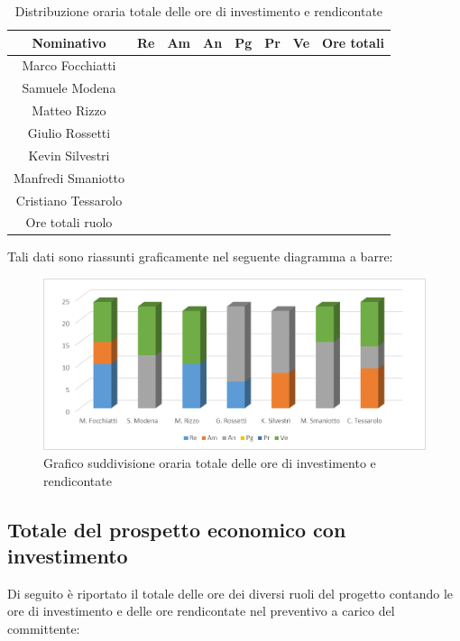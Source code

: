 \documentclass[./PianodiProgetto.tex]{subfiles}
\begin{document}
\begin{table}[H]
	\centering
	\begin{tabular}{|c|cccccc|c|}
		\hline
		Nominativo&Re&Am&An&Pg&Pr&Ve&Ore totali\\ \hline
		Marco Focchiatti& & & & & & & \\ \hline
		Samuele Modena& & & & & & & \\ \hline
		Matteo Rizzo& & & & & & & \\ \hline
		Giulio Rossetti& & & & & & & \\ \hline
		Kevin Silvestri& & & & & & & \\ \hline
		Manfredi Smaniotto& & & & & & & \\ \hline
		Cristiano Tessarolo& & & & & & & \\  \hline
		Ore totali ruolo& & & & & & & \\ \hline
	\end{tabular}
	\caption{Distribuzione oraria totale delle ore di investimento e rendicontate}
\end{table}

Tali dati sono riassunti graficamente nel seguente diagramma a barre:
\begin{figure}[H]
	\centering
	\includegraphics[width=1\linewidth]{img/grafici/OreInvestimentoRendicontateProspettoOrario}
	\caption{Grafico suddivisione oraria totale delle ore di investimento e rendicontate}
	\label{fig:ore-investimento-rendicontate-prospetto-orario}
\end{figure}

\subsection{Totale del prospetto economico con investimento}
Di seguito è riportato il totale delle ore dei diversi ruoli del progetto contando le ore di investimento e delle ore rendicontate nel preventivo a carico del committente:
\end{document}
